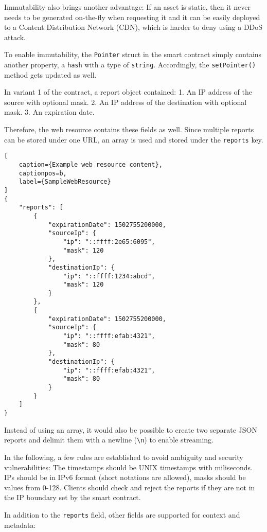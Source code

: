 Immutability also brings another advantage: If an asset is static, then it never needs to be generated on-the-fly when requesting it and it can be easily deployed to a Content Distribution Network (CDN), which is harder to deny using a DDoS attack.

To enable immutability, the \texttt{Pointer} struct in the smart contract simply contains another property, a \texttt{hash} with a type of \texttt{string}. Accordingly, the \texttt{setPointer()} method gets updated as well.

In variant 1 of the contract, a report object contained:
1. An IP address of the source with optional mask.
2. An IP address of the destination with optional mask.
3. An expiration date.

Therefore, the web resource contains these fields as well. Since multiple reports can be stored under one URL, an array is used and stored under the \texttt{reports} key.

\begin{lstlisting}[
    caption={Example web resource content},
    captionpos=b,
    label={SampleWebResource}
]
{
    "reports": [
        {
            "expirationDate": 1502755200000,
            "sourceIp": {
                "ip": "::ffff:2e65:6095",
                "mask": 120
            },
            "destinationIp": {
                "ip": "::ffff:1234:abcd",
                "mask": 120
            }
        },
        {
            "expirationDate": 1502755200000,
            "sourceIp": {
                "ip": "::ffff:efab:4321",
                "mask": 80
            },
            "destinationIp": {
                "ip": "::ffff:efab:4321",
                "mask": 80
            }
        }
    ]
}
\end{lstlisting}

Instead of using an array, it would also be possible to create two separate JSON reports and delimit them with a newline (\texttt{{\textbackslash}n}) to enable streaming.

In the following, a few rules are established to avoid ambiguity and security vulnerabilities: The timestamps should be UNIX timestamps with miliseconds. IPs should be in IPv6 format (short notations are allowed), masks should be values from 0-128. Clients should check and reject the reports if they are not in the IP boundary set by the smart contract.

In addition to the \texttt{reports} field, other fields are supported for context and metadata:

